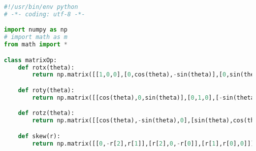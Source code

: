 \begin{lstlisting}[frame=lines,language=Python, caption=meiosis\_utils.py]
#!/usr/bin/env python
# -*- coding: utf-8 -*-

import numpy as np
# import math as m
from math import *

class matrixOp:
    def rotx(theta):
        return np.matrix([[1,0,0],[0,cos(theta),-sin(theta)],[0,sin(theta),cos(theta)]])

    def roty(theta):
        return np.matrix([[cos(theta),0,sin(theta)],[0,1,0],[-sin(theta),0,cos(theta)]])

    def rotz(theta):
        return np.matrix([[cos(theta),-sin(theta),0],[sin(theta),cos(theta),0],[0,0,1]])

    def skew(r):
        return np.matrix([[0,-r[2],r[1]],[r[2],0,-r[0]],[r[1],r[0],0]])
\end{lstlisting}
\vspace{10ex}


